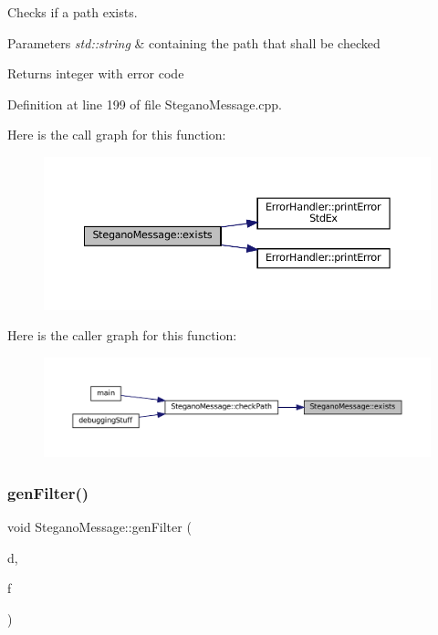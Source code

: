 Checks if a path exists. 


\begin{DoxyParams}{Parameters}
{\em std\+::string} & containing the path that shall be checked \\
\hline
\end{DoxyParams}
\begin{DoxyReturn}{Returns}
integer with error code 
\end{DoxyReturn}


Definition at line 199 of file Stegano\+Message.\+cpp.

Here is the call graph for this function\+:
\nopagebreak
\begin{figure}[H]
\begin{center}
\leavevmode
\includegraphics[width=350pt]{classSteganoMessage_acc5a49a35b46d8bf4c40cca8b8c5a52b_cgraph}
\end{center}
\end{figure}
Here is the caller graph for this function\+:
\nopagebreak
\begin{figure}[H]
\begin{center}
\leavevmode
\includegraphics[width=350pt]{classSteganoMessage_acc5a49a35b46d8bf4c40cca8b8c5a52b_icgraph}
\end{center}
\end{figure}
\mbox{\label{classSteganoMessage_a1cb326688e9a054127396d198bd6f976}} 
\subsubsection{\texorpdfstring{genFilter()}{genFilter()}}
{\footnotesize\ttfamily void Stegano\+Message\+::gen\+Filter (\begin{DoxyParamCaption}\item[{std\+::vector$<$ std\+::vector$<$ uint32\+\_\+t $>$$>$ $\ast$}]{d,  }\item[{uint32\+\_\+t($\ast$)(uint32\+\_\+t, size\+\_\+t)}]{f }\end{DoxyParamCaption})\hspace{0.3cm}{\ttfamily [private]}}



